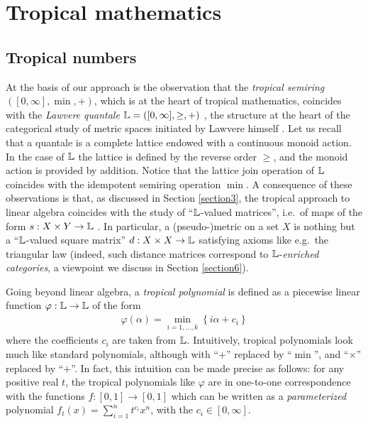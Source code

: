  
\section{Tropical mathematics%
}

\subsection{Tropical numbers}

At the basis of our approach is the observation that the \emph{tropical semiring} $([0,\infty], \min, +)$, which is at the heart of tropical mathematics, coincides with the \emph{Lawvere quantale} $\mathbb{L}=([0,\infty], \geq, +)$ \cite{}, the structure at the heart of the categorical study of metric spaces initiated by Lawvere himself \cite{}.
Let us recall that a quantale is a complete lattice endowed with a continuous monoid action. In the case of $\mathbb{L}$ the lattice is defined by the reverse order $\geq$, and the monoid action is provided by addition. Notice that the lattice join operation of $\mathbb{L}$ coincides with the idempotent semiring operation $\min$. 
A consequence of these observations is that, as discussed in Section \ref{section3}, the tropical approach to linear algebra coincides with the study of ``$\mathbb{L}$-valued matrices'', i.e.~of maps of the form $s: X\times Y\to \mathbb{L}$ .
In particular, a (pseudo-)metric on a set $X$ is nothing but a ``$\mathbb{L}$-valued square matrix'' $d:X\times X\to \mathbb{L}$ satisfying axioms like e.g.~the triangular law (indeed, such distance matrices correspond to $\mathbb{L}$-\emph{enriched categories}, a viewpoint we discuss in Section \ref{section6}). 

Going beyond linear algebra, a \emph{tropical polynomial} is defined as a piecewise linear function $\varphi:\mathbb{L}\to \mathbb{L}$ of the form 
\begin{align}\label{eq:polytrop}
\varphi(\alpha)= \min_{i=1,\dots,k}\left\{ i\alpha + c_{i}\right\}
\end{align}
where the coefficients $c_{i}$ are taken from $\mathbb{L}$. 
%
Intuitively, tropical polynomials look much like standard polynomials, although with ``$+$'' replaced by ``$\min$'', and ``$\times$'' replaced by ``$+$''. 
In fact, this intuition can be made precise as follows: for any positive real $t$, the tropical polynomials like $\varphi$ are in one-to-one correspondence with the functions $f:[0,1]\to [0,1]$ which can be written as a \emph{parameterized} polynomial 
$f_{t}(x)= \sum_{i=1}^{n}t^{c_{i}}x^{n}$, with the $c_{i}\in [0,\infty]$. 






